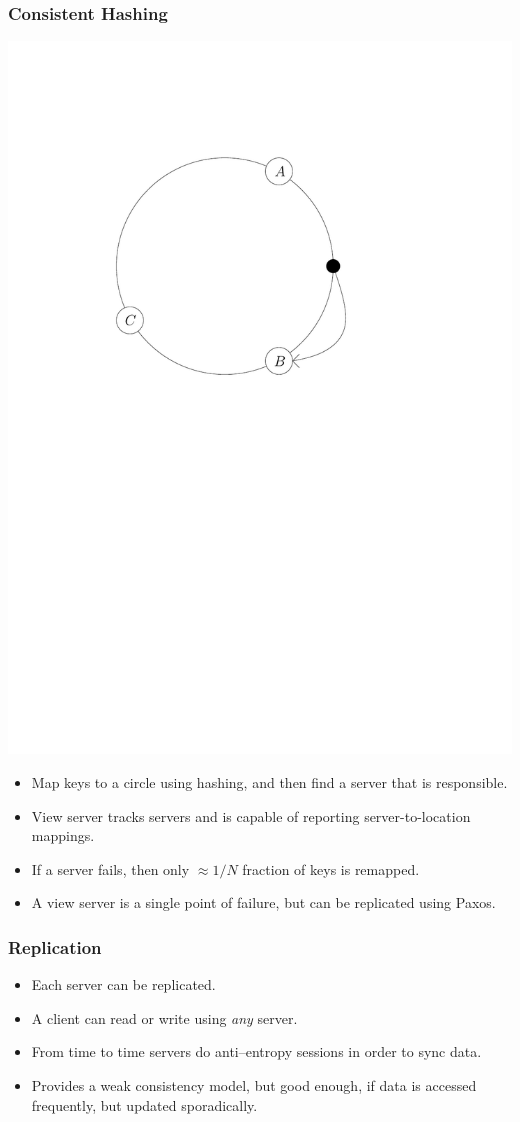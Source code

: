 \documentclass{beamer}
\begin{document}
    \begin{frame}
        \frametitle{Consistent Hashing}
        \includegraphics[scale=0.3]{hashing.pdf}
        \begin{itemize}
            \item Map keys to a circle using hashing, and then find a server that is responsible.
            \item View server tracks servers and is capable of reporting server-to-location mappings.
            \item If a server fails, then only $\approx 1/N$ fraction of keys is remapped.
            \item A view server is a single point of failure, but can be replicated using Paxos.
        \end{itemize}
    \end{frame}
    \begin{frame}
        \frametitle{Replication}
        \begin{itemize}
            \item Each server can be replicated.
            \item A client can read or write using \emph{any} server.
            \item From time to time servers do anti--entropy sessions in order to sync data.
            \item Provides a weak consistency model, but good enough, if data is accessed frequently, but updated
            sporadically.
        \end{itemize}
    \end{frame}
\end{document}
